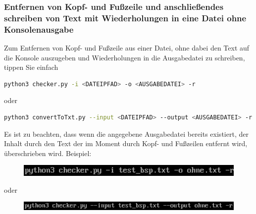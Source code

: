 \documentclass[12pt]{scrartcl}
\begin{document}
\subsubsection{Entfernen von Kopf- und Fußzeile und anschließendes schreiben von Text mit Wiederholungen in eine Datei ohne Konsolenausgabe}
\label{sec:first-steps-extraction-file-with}
Zum Entfernen von Kopf- und Fußzeile aus einer Datei, ohne dabei den Text auf die Konsole auszugeben und Wiederholungen in die Ausgabedatei zu schreiben, tippen Sie einfach
\begin{lstlisting}[language=bash]
python3 checker.py -i <DATEIPFAD> -o <AUSGABEDATEI> -r
\end{lstlisting}
\begin{center}
oder
\end{center}
\begin{lstlisting}[language=bash] 
python3 convertToTxt.py --input <DATEIPFAD> --output <AUSGABEDATEI> -r
\end{lstlisting}
Es ist zu beachten, dass wenn die angegebene Ausgabedatei bereits existiert, der Inhalt durch den Text der im Moment durch Kopf- und Fußzeilen entfernt wird, überschrieben wird. 
Beispiel:
\begin{figure}[htbp]
\includegraphics[width=1.0\textwidth]{ersteSchritteKopfFussIntoFileWithoutConsoleWithReplicates001}\par\vspace{0.25cm}
\label{fig:ersteSchritteKopfFussIntoFileWithoutConsoleWithReplicates001}
\end{figure}
\begin{center}
oder
\end{center}
\begin{figure}[htbp]
\includegraphics[width=1.0\textwidth]{ersteSchritteKopfFussIntoFileWithoutConsoleWithReplicates002}\par

\vspace{0.25cm}
\label{fig:ersteSchritteKopfFussIntoFileWithConsoleWithReplicates002}
\end{figure}

\newpage
\end{document}
